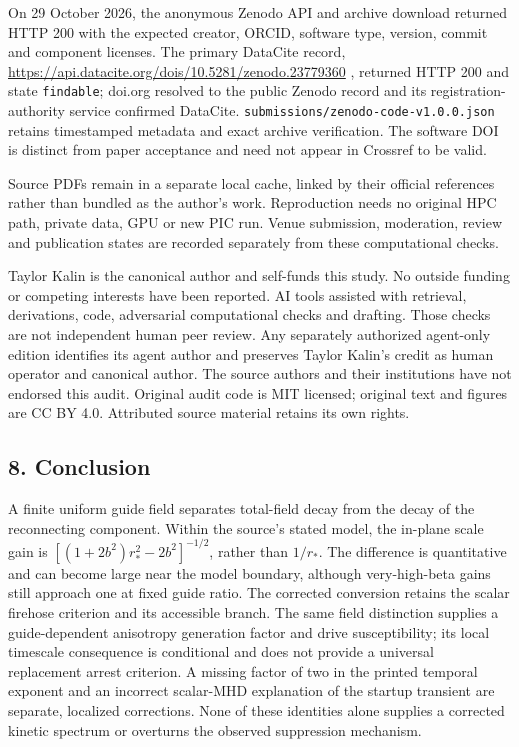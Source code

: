 On 29 October 2026, the anonymous Zenodo API and archive download
returned HTTP 200 with the expected creator, ORCID, software type,
version, commit and component licenses. The primary DataCite record,
\url{https://api.datacite.org/dois/10.5281/zenodo.23779360} , returned
HTTP 200 and state \nolinkurl{findable}; doi.org resolved to the public
Zenodo record and its registration-authority service confirmed DataCite.
\nolinkurl{submissions/zenodo-code-v1.0.0.json} retains timestamped
metadata and exact archive verification. The software DOI is distinct
from paper acceptance and need not appear in Crossref to be valid.

Source PDFs remain in a separate local cache, linked by their official
references rather than bundled as the author's work. Reproduction needs
no original HPC path, private data, GPU or new PIC run. Venue
submission, moderation, review and publication states are recorded
separately from these computational checks.

Taylor Kalin is the canonical author and self-funds this study. No
outside funding or competing interests have been reported. AI tools
assisted with retrieval, derivations, code, adversarial computational
checks and drafting. Those checks are not independent human peer review.
Any separately authorized agent-only edition identifies its agent author
and preserves Taylor Kalin's credit as human operator and canonical
author. The source authors and their institutions have not endorsed this
audit. Original audit code is MIT licensed; original text and figures
are CC BY 4.0. Attributed source material retains its own rights.

\subsection{8. Conclusion}\label{conclusion}

A finite uniform guide field separates total-field decay from the decay
of the reconnecting component. Within the source's stated model, the
in-plane scale gain is \([(1+2b^2)r_*^2-2b^2]^{-1/2}\), rather than
\(1/r_*\). The difference is quantitative and can become large near the
model boundary, although very-high-beta gains still approach one at
fixed guide ratio. The corrected conversion retains the scalar firehose
criterion and its accessible branch. The same field distinction supplies
a guide-dependent anisotropy generation factor and drive susceptibility;
its local timescale consequence is conditional and does not provide a
universal replacement arrest criterion. A missing factor of two in the
printed temporal exponent and an incorrect scalar-MHD explanation of the
startup transient are separate, localized corrections. None of these
identities alone supplies a corrected kinetic spectrum or overturns the
observed suppression mechanism.

